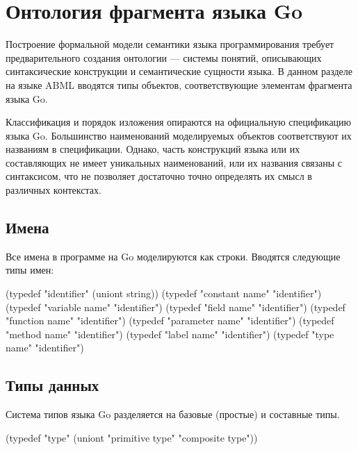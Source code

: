 \documentclass[12pt,twoside,russian]{article}
\begin{document}

\section{Онтология фрагмента языка Go}
Построение формальной модели семантики языка программирования требует предварительного создания онтологии — системы понятий, описывающих синтаксические конструкции и семантические сущности языка. В данном разделе на языке ABML вводятся типы объектов, соответствующие элементам фрагмента языка Go.

Классификация и порядок изложения опираются на официальную спецификацию языка Go. Большинство наименований моделируемых объектов соответствуют их названиям в спецификации. Однако, часть конструкций языка или их составляющих не имеет уникальных наименований, или их названия связаны с синтаксисом, что не позволяет достаточно точно определять их смысл в различных контекстах.

\subsection{Имена}
Все имена в программе на Go моделируются как строки. Вводятся следующие типы имен:

\begin{ABMLCode}
(typedef "identifier"     (uniont string))
(typedef "constant name"  "identifier")
(typedef "variable name"  "identifier")
(typedef "field name"     "identifier")
(typedef "function name"  "identifier")
(typedef "parameter name" "identifier")
(typedef "method name"    "identifier")
(typedef "label name"     "identifier")
(typedef "type name"      "identifier")
\end{ABMLCode}

\subsection{Типы данных}
Система типов языка Go разделяется на базовые (простые) и составные типы.

\begin{ABMLCode}
(typedef "type" (uniont "primitive type" "composite type"))
\end{ABMLCode}
\end{document}
